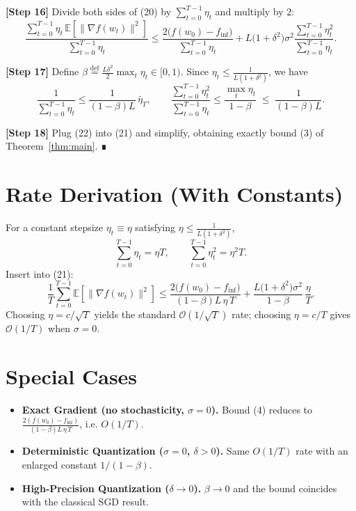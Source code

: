 \documentclass{article}
\newcommand{\E}{\mathbb{E}}
\begin{document}
\noindent\textbf{[Step 16]} Divide both sides of (20) by $\sum_{t=0}^{T-1}\eta_{t}$ and multiply by $2$:
\[
\frac{\sum_{t=0}^{T-1}\eta_{t}\,\E[\|\nabla f(w_{t})\|^{2}]}
     {\sum_{t=0}^{T-1}\eta_{t}}
\le
\frac{2\big(f(w_{0})-f_{\inf}\big)}{\sum_{t=0}^{T-1}\eta_{t}}
+L\big(1+\delta^{2}\big)\sigma^{2}
\frac{\sum_{t=0}^{T-1}\eta_{t}^{2}}{\sum_{t=0}^{T-1}\eta_{t}}.
\tag{21}
\]

\noindent\textbf{[Step 17]} Define $\beta\stackrel{\text{def}}{=}\frac{L\delta^{2}}{2}\max_{t}\eta_{t}\in[0,1)$.
Since $\eta_{t}\le\frac{1}{L(1+\delta^{2})}$, we have
\[
\frac{1}{\sum_{t=0}^{T-1}\eta_{t}}
\le\frac{1}{(1-\beta)L}\,\bar\eta_{T},
\qquad
\frac{\sum_{t=0}^{T-1}\eta_{t}^{2}}{\sum_{t=0}^{T-1}\eta_{t}}
\le\frac{\max_{t}\eta_{t}}{1-\beta}\;\le\;\frac{1}{(1-\beta)L}.
\tag{22}
\]

\noindent\textbf{[Step 18]} Plug (22) into (21) and simplify, obtaining exactly bound (3) of Theorem~\ref{thm:main}. ∎

\section*{Rate Derivation (With Constants)}
For a constant stepsize $\eta_{t}\equiv\eta$ satisfying $\eta\le\frac{1}{L(1+\delta^{2})}$,
\[
\sum_{t=0}^{T-1}\eta_{t}= \eta T,\qquad
\sum_{t=0}^{T-1}\eta_{t}^{2}= \eta^{2}T .
\]
Insert into (21):
\[
\frac{1}{T}\sum_{t=0}^{T-1}\E[\|\nabla f(w_{t})\|^{2}]
\le
\frac{2\big(f(w_{0})-f_{\inf}\big)}{(1-\beta)L\,\eta\,T}
+\frac{L\big(1+\delta^{2}\big)\sigma^{2}}{1-\beta}\,\frac{\eta}{T}.
\]
Choosing $\eta=c/\sqrt{T}$ yields the standard $\mathcal O(1/\sqrt{T})$ rate; choosing $\eta=c/T$ gives $\mathcal O(1/T)$ when $\sigma=0$.

\section*{Special Cases}
\begin{itemize}
\item \textbf{Exact Gradient (no stochasticity, $\sigma=0$).}  
Bound (4) reduces to $\displaystyle\frac{2(f(w_{0})-f_{\inf})}{(1-\beta)L\,\eta\,T}$, i.e. $O(1/T)$.
\item \textbf{Deterministic Quantization ($\sigma=0$, $\delta>0$).}  
Same $O(1/T)$ rate with an enlarged constant $1/(1-\beta)$.
\item \textbf{High‑Precision Quantization ($\delta\to0$).}  
$\beta\to0$ and the bound coincides with the classical SGD result.
\end{itemize}
\end{document}
